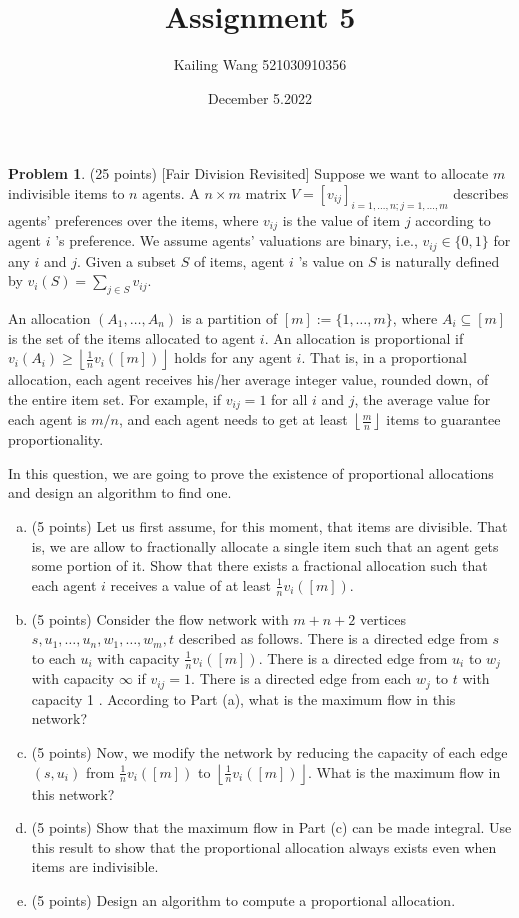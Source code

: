 \documentclass{article}
\theoremstyle{definition}
\newtheorem{prob}{Problem}
\begin{document}
	\title{Assignment 5}
	\author{Kailing Wang 521030910356}
	\date{December 5.2022}
	\maketitle
	
	\begin{prob}
		(25 points) [Fair Division Revisited] Suppose we want to allocate $m$ indivisible items to $n$ agents. A $n \times m$ matrix $V=\left[v_{i j}\right]_{i=1, \ldots, n ; j=1, \ldots, m}$ describes agents' preferences over the items, where $v_{i j}$ is the value of item $j$ according to agent $i$ 's preference. We assume agents' valuations are binary, i.e., $v_{i j} \in\{0,1\}$ for any $i$ and $j$. Given a subset $S$ of items, agent $i$ 's value on $S$ is naturally defined by $v_{i}(S)=\sum_{j \in S} v_{i j}$.

		\noindent An allocation $\left(A_{1}, \ldots, A_{n}\right)$ is a partition of $[m]:=\{1, \ldots, m\}$, where $A_{i} \subseteq[m]$ is the set of the items allocated to agent $i$. An allocation is proportional if $v_{i}\left(A_{i}\right) \geq\left\lfloor\frac{1}{n} v_{i}([m])\right\rfloor$ holds for any agent $i$. That is, in a proportional allocation, each agent receives his/her average integer value, rounded down, of the entire item set. For example, if $v_{i j}=1$ for all $i$ and $j$, the average value for each agent is $m / n$, and each agent needs to get at least $\left\lfloor\frac{m}{n}\right\rfloor$ items to guarantee proportionality.
		
		\noindent In this question, we are going to prove the existence of proportional allocations and design an algorithm to find one.
		
		\begin{enumerate}[(a)]
			\item (5 points) Let us first assume, for this moment, that items are divisible. That is, we are allow to fractionally allocate a single item such that an agent gets some portion of it. Show that there exists a fractional allocation such that each agent $i$ receives a value of at least $\frac{1}{n} v_{i}([m])$.
			\item (5 points) Consider the flow network with $m+n+2$ vertices $s, u_{1}, \ldots, u_{n}, w_{1}, \ldots, w_{m}, t$ described as follows. There is a directed edge from $s$ to each $u_{i}$ with capacity $\frac{1}{n} v_{i}([m])$. There is a directed edge from $u_{i}$ to $w_{j}$ with capacity $\infty$ if $v_{i j}=1$. There is a directed edge from each $w_{j}$ to $t$ with capacity 1 . According to Part (a), what is the maximum flow in this network?
			\item (5 points) Now, we modify the network by reducing the capacity of each edge $\left(s, u_{i}\right)$ from $\frac{1}{n} v_{i}([m])$ to $\left\lfloor\frac{1}{n} v_{i}([m])\right\rfloor$. What is the maximum flow in this network?
			\item (5 points) Show that the maximum flow in Part (c) can be made integral. Use this result to show that the proportional allocation always exists even when items are indivisible.
			\item (5 points) Design an algorithm to compute a proportional allocation. 
			

\end{enumerate}
\end{prob}
\end{document}
